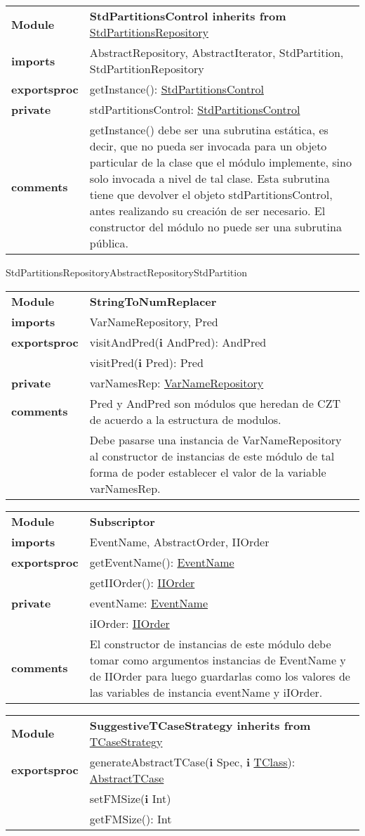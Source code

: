 \documentclass[12pt,a4paper,fleqn]{report}
\newenvironment{module}[1]{\hypertarget{mi:#1}{} \vspace{0.5cm}\noindent\begin{tabular}{|p{0.2\textwidth} p{0.75\textwidth}|} \hline{\bf Module} & {\bf #1} \\}{\hline\end{tabular}\vspace{0.5cm}}
\newenvironment{hmodule}[2]{\hypertarget{mi:#1}{} \vspace{0.5cm}\noindent\begin{tabular}{|p{0.2\textwidth} p{0.75\textwidth}|} \hline{\bf Module} & {\bf #1 inherits from} \hyperlink{mi:#2}{#2} \\}{\hline\end{tabular}\vspace{0.5cm}}
\newcommand{\eproc}{{\bf exportsproc}}
\newcommand{\priv}{{\bf private}}
\newcommand{\proc}[1]{& #1 \\}
\newcommand{\e}[1]{{\bf i} \hyperlink{mi:#1}{#1}}
\newcommand{\eb}[1]{{\bf i} #1}
\newcommand{\imp}[1]{{\bf imports} & #1 \\}
\newcommand{\comm}[1]{{\bf comments} & #1 \\}
\newcommand{\mdr}[1]{\hyperlink{mi:#1}{#1}}
\newcommand{\extraline}[1]{& #1 \\}
\begin{document}
\begin{hmodule}{StdPartitionsControl}{StdPartitionsRepository}
\imp{AbstractRepository, AbstractIterator, StdPartition, StdPartitionRepository}
\eproc
\proc{getInstance(): \mdr{StdPartitionsControl}}
\priv
\proc{stdPartitionsControl: \mdr{StdPartitionsControl}}
\comm{getInstance() debe ser una subrutina estática, es decir, que no pueda ser invocada para un objeto particular de la clase que el módulo implemente, sino solo invocada a nivel
 de tal clase. Esta subrutina tiene que devolver el objeto stdPartitionsControl, antes realizando su creación de ser necesario. El constructor del módulo no puede ser una subrutina pública.}
\end{hmodule}



\begin{cmodule}{StdPartitionsRepository}{AbstractRepository}{StdPartition}
\end{cmodule}



\begin{module}{StringToNumReplacer}
\imp{VarNameRepository, Pred}
\eproc
\proc{visitAndPred(\eb {AndPred}): AndPred}
\proc{visitPred(\eb {Pred}): Pred}
\priv
\proc{varNamesRep: \mdr{VarNameRepository}}
\comm{Pred y AndPred son módulos que heredan de CZT de acuerdo a la estructura de modulos.}
\extraline{Debe pasarse una instancia de VarNameRepository al constructor de instancias de este módulo de tal forma de poder establecer el valor de la variable varNamesRep.}
\end{module}



\begin{module}{Subscriptor}
\imp{EventName, AbstractOrder, IIOrder}
\eproc
\proc{getEventName(): \mdr{EventName}}
\proc{getIIOrder(): \mdr{IIOrder}}
\priv
\proc{eventName: \mdr{EventName}}
\proc{iIOrder: \mdr{IIOrder}}
\comm{El constructor de instancias de este módulo debe tomar como argumentos instancias de EventName y de IIOrder para luego guardarlas como los valores de las variables de instancia eventName y iIOrder.}
\end{module}



\begin{hmodule}{SuggestiveTCaseStrategy}{TCaseStrategy}
\eproc
\proc{generateAbstractTCase(\eb {Spec}, \e {TClass}): \mdr{AbstractTCase}}
\proc{setFMSize(\eb {Int})}
\proc{getFMSize(): Int}
\end{hmodule}
\end{document}
